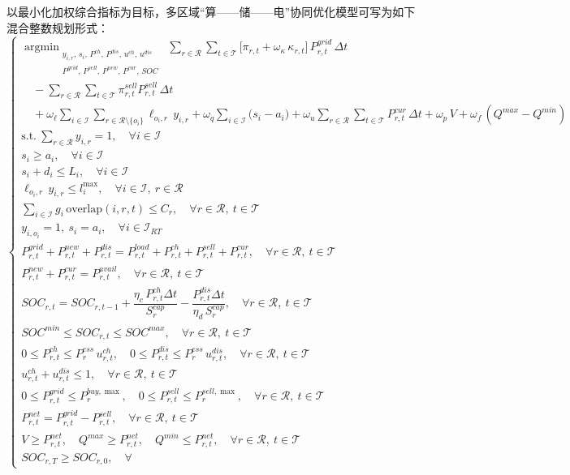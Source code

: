 \documentclass{ctexart}
\DeclareMathOperator*{\argmin}{argmin}
\begin{document}
以最小化加权综合指标为目标，多区域“算——储——电”协同优化模型可写为如下混合整数规划形式：
\begin{equation}
\begin{cases}
\displaystyle\argmin_{\substack{y_{i,r},\,s_i,\,P^{ch},\,P^{dis},\,u^{ch},\,u^{dis}\\P^{grid},\,P^{sell},\,P^{new},\,P^{cur},\,SOC}}\ \sum_{r\in\mathcal{R}}\sum_{t\in\mathcal{T}}\big[\pi_{r,t}+\omega_\kappa\,\kappa_{r,t}\big]\,P^{grid}_{r,t}\,\Delta t\\\quad-\sum_{r\in\mathcal{R}}\sum_{t\in\mathcal{T}}\pi^{sell}_{r,t}P^{sell}_{r,t}\,\Delta t\\\quad+\omega_\ell\sum_{i\in\mathcal{I}}\sum_{r\in\mathcal{R}\setminus\{o_i\}}\ell_{o_i,r}\,y_{i,r}+\omega_q\sum_{i\in\mathcal{I}}\big(s_i-a_i\big)+\omega_u\sum_{r\in\mathcal{R}}\sum_{t\in\mathcal{T}}P^{cur}_{r,t}\,\Delta t+\omega_p\,V+\omega_f\,(Q^{max}-Q^{min})\\\text{s.t.}\ \sum_{r\in\mathcal{R}}y_{i,r}=1,\quad \forall i\in\mathcal{I}\\s_i\ge a_i,\quad \forall i\in\mathcal{I}\\s_i+d_i\le L_i,\quad \forall i\in\mathcal{I}\\\ell_{o_i,r}\,y_{i,r}\le l_i^{\max},\quad \forall i\in\mathcal{I},\ r\in\mathcal{R}\\\sum_{i\in\mathcal{I}}g_i\,\mathrm{overlap}(i,r,t)\le C_r,\quad \forall r\in\mathcal{R},\ t\in\mathcal{T}\\y_{i,o_i}=1,\ s_i=a_i,\quad \forall i\in\mathcal{I}_{RT}\\P^{grid}_{r,t}+P^{new}_{r,t}+P^{dis}_{r,t}=P^{load}_{r,t}+P^{ch}_{r,t}+P^{sell}_{r,t}+P^{cur}_{r,t},\quad \forall r\in\mathcal{R},\ t\in\mathcal{T}\\P^{new}_{r,t}+P^{cur}_{r,t}=P^{avail}_{r,t},\quad \forall r\in\mathcal{R},\ t\in\mathcal{T}\\SOC_{r,t}=SOC_{r,t-1}+\dfrac{\eta_c\,P^{ch}_{r,t}\Delta t}{S^{cap}_r}-\dfrac{P^{dis}_{r,t}\Delta t}{\eta_d\,S^{cap}_r},\quad \forall r\in\mathcal{R},\ t\in\mathcal{T}\\SOC^{min}\le SOC_{r,t}\le SOC^{max},\quad \forall r\in\mathcal{R},\ t\in\mathcal{T}\\0\le P^{ch}_{r,t}\le P^{ess}_r\,u^{ch}_{r,t},\quad 0\le P^{dis}_{r,t}\le P^{ess}_r\,u^{dis}_{r,t},\quad \forall r\in\mathcal{R},\ t\in\mathcal{T}\\u^{ch}_{r,t}+u^{dis}_{r,t}\le 1,\quad \forall r\in\mathcal{R},\ t\in\mathcal{T}\\0\le P^{grid}_{r,t}\le P^{buy,\max}_r,\quad 0\le P^{sell}_{r,t}\le P^{sell,\max}_r,\quad \forall r\in\mathcal{R},\ t\in\mathcal{T}\\P^{net}_{r,t}=P^{grid}_{r,t}-P^{sell}_{r,t},\quad \forall r\in\mathcal{R},\ t\in\mathcal{T}\\V\ge P^{net}_{r,t},\quad Q^{max}\ge P^{net}_{r,t},\quad Q^{min}\le P^{net}_{r,t},\quad \forall r\in\mathcal{R},\ t\in\mathcal{T}\\SOC_{r,T}\ge SOC_{r,0},\quad \forall 
\end{cases}
\end{equation}
\end{document}

